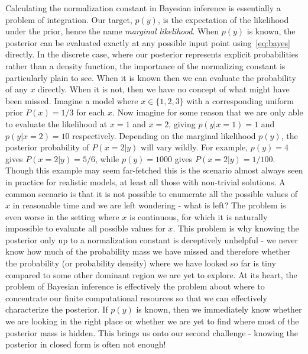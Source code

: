 Calculating the normalization constant in Bayesian inference is essentially a problem of
integration.  Our target, $p(y)$, is the expectation of the likelihood under the prior,
hence the name \emph{marginal likelihood}.  When $p(y)$ is known, the posterior can be evaluated
exactly at any possible input point using~\eqref{eq:bayes} directly.  In the discrete case,
where our posterior represents explicit probabilities rather than a density function, the importance
of the normalizing constant is particularly plain to see.  When it is known then we can evaluate
the probability of any $x$ directly.  When it is not, then we have no concept of what might have been
missed.  Imagine a model where $x \in \{1,2,3\}$ with a corresponding uniform prior $P(x) = 1/3$
for each $x$.  Now imagine for some reason that we are only able to evaluate the likelihood at 
$x=1$ and $x=2$, giving $p(y|x=1)=1$ and $p(y|x=2)=10$ respectively.  Depending on the marginal
likelihood $p(y)$, the posterior probability of $P(x=2 | y)$ will vary wildly.  For example,
$p(y)=4$ gives $P(x=2 | y) = 5/6$, while $p(y)=1000$ gives $P(x=2 | y) = 1/100$.  Though this
example may seem far-fetched this is the scenario almost always seen in practice for realistic
models, at least all those with non-trivial solutions.  A common scenario is that it is not
possible to enumerate all the possible values of $x$ in reasonable time and we are left 
wondering - what is left?  The problem is even worse in the setting where $x$ is continuous, for
which it is naturally impossible to evaluate all possible values for $x$.  This problem is why
knowing the posterior only up to a normalization constant is deceptively unhelpful - we never
know how much of the probability mass we have missed and therefore whether the probability (or
probability density) where we have looked so far is tiny compared to some other dominant region
we are yet to explore.  At its heart, the problem of Bayesian inference is effectively the problem
about where to concentrate our finite computational resources so that we can effectively characterize
the posterior.  If $p(y)$ is known, then we immediately know whether we are looking in the right
place or whether we are yet to find where most of the posterior mass is hidden.  This brings us onto
our second challenge - knowing the posterior in closed form is often not enough!



